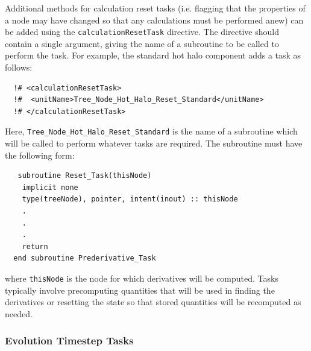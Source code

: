 Additional methods for calculation reset tasks (i.e. flagging that the properties of a node may have changed so that any calculations must be performed anew) can be added using the {\tt calculationResetTask} directive. The directive should contain a single argument, giving the name of a subroutine to be called to perform the task. For example, the standard hot halo component adds a task as follows:
\begin{verbatim}
  !# <calculationResetTask>
  !#  <unitName>Tree_Node_Hot_Halo_Reset_Standard</unitName>
  !# </calculationResetTask>
\end{verbatim}
Here, {\tt Tree\_Node\_Hot\_Halo\_Reset\_Standard} is the name of a subroutine which will be called to perform whatever tasks are required. The subroutine must have the following form:
\begin{verbatim}
   subroutine Reset_Task(thisNode)
    implicit none
    type(treeNode), pointer, intent(inout) :: thisNode
    .
    .
    .
    return
  end subroutine Prederivative_Task
\end{verbatim}
where {\tt thisNode} is the node for which derivatives will be computed. Tasks typically involve precomputing quantities that will be used in finding the derivatives or resetting the state so that stored quantities will be recomputed as needed.

\subsubsection{Evolution Timestep Tasks}

